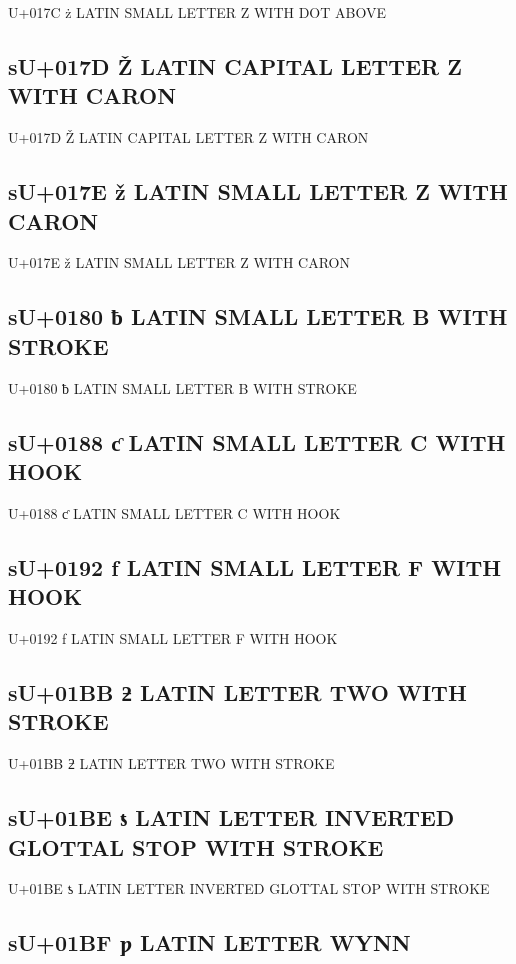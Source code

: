 U+017C ż  LATIN SMALL LETTER Z WITH DOT ABOVE

\subsection{sU+017D Ž  LATIN CAPITAL LETTER Z WITH CARON}

U+017D Ž  LATIN CAPITAL LETTER Z WITH CARON

\subsection{sU+017E ž  LATIN SMALL LETTER Z WITH CARON}

U+017E ž  LATIN SMALL LETTER Z WITH CARON

\subsection{sU+0180 ƀ LATIN SMALL LETTER B WITH STROKE}

U+0180 ƀ LATIN SMALL LETTER B WITH STROKE

\subsection{sU+0188 ƈ LATIN SMALL LETTER C WITH HOOK}

U+0188 ƈ LATIN SMALL LETTER C WITH HOOK

\subsection{sU+0192 ƒ  LATIN SMALL LETTER F WITH HOOK}

U+0192 ƒ  LATIN SMALL LETTER F WITH HOOK

\subsection{sU+01BB ƻ LATIN LETTER TWO WITH STROKE}

U+01BB ƻ LATIN LETTER TWO WITH STROKE

\subsection{sU+01BE ƾ LATIN LETTER INVERTED GLOTTAL STOP WITH STROKE}

U+01BE ƾ LATIN LETTER INVERTED GLOTTAL STOP WITH STROKE

\subsection{sU+01BF ƿ LATIN LETTER WYNN}

